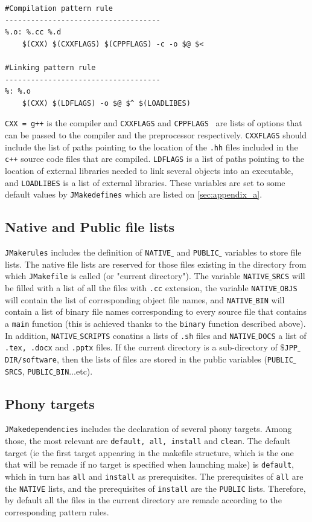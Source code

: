 \documentclass[t]{article}
\begin{document}
\begin{lstlisting}
#Compilation pattern rule
------------------------------------
%.o: %.cc %.d
	$(CXX) $(CXXFLAGS) $(CPPFLAGS) -c -o $@ $<

#Linking pattern rule
------------------------------------
%: %.o
	$(CXX) $(LDFLAGS) -o $@ $^ $(LOADLIBES)

\end{lstlisting}
{\tt CXX = g++} is the compiler and {\tt CXXFLAGS} and {\tt CPPFLAGS } are lists of options that can be passed to the compiler and the preprocessor respectively. {\tt CXXFLAGS} should  include the list of paths pointing to the location of the {\tt .hh} files included in the {\tt c++} source code files that are compiled. {\tt LDFLAGS} is a list of paths pointing to the location of external libraries needed to link several objects into an executable, and {\tt LOADLIBES} is a list of external libraries. These variables are set to some default values by {\tt JMakedefines} which are listed on \ref{sec:appendix_a}.

\subsection{Native and Public file lists}  
{\tt JMakerules} includes the definition of {\tt NATIVE$\_$} and {\tt PUBLIC$\_$} variables to store file lists. The native file lists are reserved for those files existing in the directory from which {\tt JMakefile} is called (or "current directory"). The variable {\tt NATIVE$\_$SRCS} will be filled with a list of all the files with {\tt .cc} extension, the variable {\tt NATIVE$\_$OBJS} will contain the list of corresponding object file names, and {\tt NATIVE$\_$BIN} will contain a list of binary file names corresponding to every source file that contains a {\tt main} function (this is achieved thanks to the {\tt binary} function described above). In addition, {\tt NATIVE$\_$SCRIPTS} conatins a lists of {\tt .sh} files and {\tt NATIVE$\_$DOCS} a list of {\tt .tex, .docx} and {\tt .pptx} files. If the current directory is a sub-directory of {\tt $\$$JPP$\_$DIR/software}, then the lists of files are stored in the public variables ({\tt PUBLIC$\_$SRCS}, {\tt PUBLIC$\_$BIN}...etc).

\subsection{Phony targets}   
{\tt JMakedependencies} includes the declaration of several phony targets. Among those, the most relevant are {\tt default, all, install} and {\tt clean}. The default target (ie the first target appearing in the makefile structure, which is the one that will be remade if no target is specified when launching make) is {\tt default}, which in turn has {\tt all} and {\tt install} as prerequisites. The prerequisites of {\tt all} are the {\tt NATIVE} lists, and the prerequisites of {\tt install} are the {\tt PUBLIC} lists. Therefore, by default all the files in the current directory are remade according to the corresponding pattern rules. 
\end{document}
